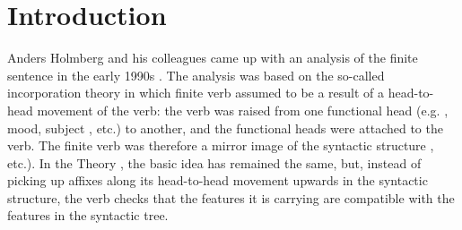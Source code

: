 \documentclass[output=paper]{langsci/langscibook}
\begin{document}
 

 

 

 

 

 

 

 

 

 




\section{Introduction} %
Anders Holmberg and his colleagues came up with an analysis of the  finite sentence in the early 1990s \citep{HolmbergEtAl1993}. The analysis was based on the so-called incorporation theory in which finite verb  assumed to be a result of a head-to-head movement of the verb: the verb was raised from one functional head (e.g. , mood, subject , etc.) to another, and the functional heads were attached to the verb. The finite verb  was therefore a mirror image of the syntactic structure \citep{Pollock1989,Baker1988incorporation,Chomsky1995}, etc.). In the  Theory \citep{Chomsky1995}, the basic idea has remained the same, but, instead of picking up affixes along its head-to-head movement upwards in the syntactic structure, the verb checks that the  features it is carrying are compatible with the features in the syntactic tree. 
\end{document}
